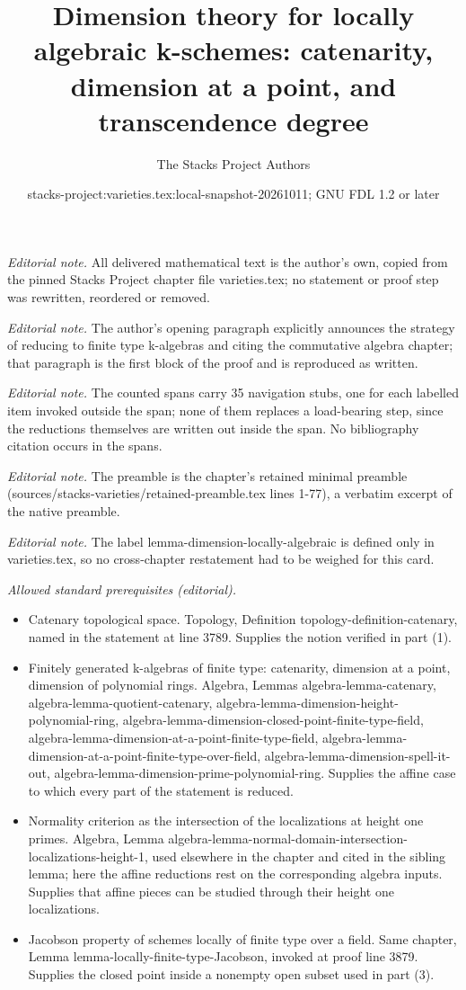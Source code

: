 \documentclass[10pt,a4paper]{amsart}
\title{Dimension theory for locally algebraic k-schemes: catenarity, dimension at a point, and transcendence degree}
\author{The Stacks Project Authors}
\date{stacks-project:varieties.tex:local-snapshot-20261011; GNU FDL 1.2 or later}
\theoremstyle{plain}
\theoremstyle{definition}
\theoremstyle{remark}
\numberwithin{equation}{subsection}
\begin{document}
\maketitle
\noindent\textit{Editorial note.} All delivered mathematical text is the author's own, copied from the pinned Stacks Project chapter file varieties.tex; no statement or proof step was rewritten, reordered or removed.\par\medskip
\noindent\textit{Editorial note.} The author's opening paragraph explicitly announces the strategy of reducing to finite type k-algebras and citing the commutative algebra chapter; that paragraph is the first block of the proof and is reproduced as written.\par\medskip
\noindent\textit{Editorial note.} The counted spans carry 35 navigation stubs, one for each labelled item invoked outside the span; none of them replaces a load-bearing step, since the reductions themselves are written out inside the span. No bibliography citation occurs in the spans.\par\medskip
\noindent\textit{Editorial note.} The preamble is the chapter's retained minimal preamble (sources/stacks-varieties/retained-preamble.tex lines 1-77), a verbatim excerpt of the native preamble.\par\medskip
\noindent\textit{Editorial note.} The label lemma-dimension-locally-algebraic is defined only in varieties.tex, so no cross-chapter restatement had to be weighed for this card.\par\medskip
\noindent\textit{Allowed standard prerequisites (editorial).}\begin{itemize}
\item Catenary topological space. Topology, Definition topology-definition-catenary, named in the statement at line 3789. Supplies the notion verified in part (1).
\item Finitely generated k-algebras of finite type: catenarity, dimension at a point, dimension of polynomial rings. Algebra, Lemmas algebra-lemma-catenary, algebra-lemma-quotient-catenary, algebra-lemma-dimension-height-polynomial-ring, algebra-lemma-dimension-closed-point-finite-type-field, algebra-lemma-dimension-at-a-point-finite-type-field, algebra-lemma-dimension-at-a-point-finite-type-over-field, algebra-lemma-dimension-spell-it-out, algebra-lemma-dimension-prime-polynomial-ring. Supplies the affine case to which every part of the statement is reduced.
\item Normality criterion as the intersection of the localizations at height one primes. Algebra, Lemma algebra-lemma-normal-domain-intersection-localizations-height-1, used elsewhere in the chapter and cited in the sibling lemma; here the affine reductions rest on the corresponding algebra inputs. Supplies that affine pieces can be studied through their height one localizations.
\item Jacobson property of schemes locally of finite type over a field. Same chapter, Lemma lemma-locally-finite-type-Jacobson, invoked at proof line 3879. Supplies the closed point inside a nonempty open subset used in part (3).
\end{itemize}\medskip
\end{document}
